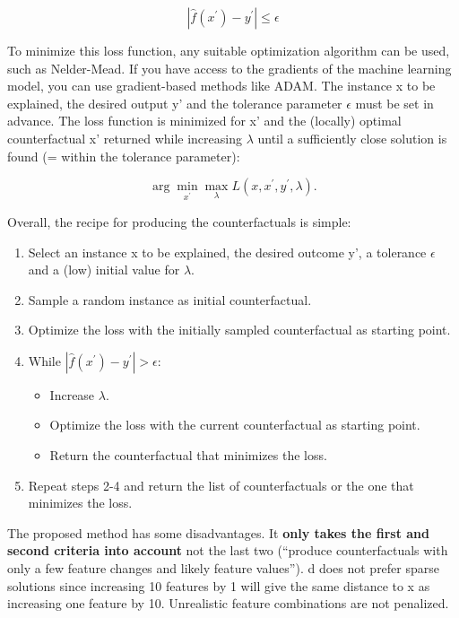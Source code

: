 \documentclass[
  10pt,
]{scrbook}
\providecommand{\tightlist}{%
  \setlength{\itemsep}{0pt}\setlength{\parskip}{0pt}}
\begin{document}
\[|\hat{f}(x^\prime)-y^\prime|\leq\epsilon\]

To minimize this loss function, any suitable optimization algorithm can be used, such as Nelder-Mead.
If you have access to the gradients of the machine learning model, you can use gradient-based methods like ADAM.
The instance x to be explained, the desired output y' and the tolerance parameter \(\epsilon\) must be set in advance.
The loss function is minimized for x' and the (locally) optimal counterfactual x' returned while increasing \(\lambda\) until a sufficiently close solution is found (= within the tolerance parameter):

\[\arg\min_{x^\prime}\max_{\lambda}L(x,x^\prime,y^\prime,\lambda).\]

Overall, the recipe for producing the counterfactuals is simple:

\begin{enumerate}
\def\labelenumi{\arabic{enumi}.}
\tightlist
\item
  Select an instance x to be explained, the desired outcome y', a tolerance \(\epsilon\) and a (low) initial value for \(\lambda\).
\item
  Sample a random instance as initial counterfactual.
\item
  Optimize the loss with the initially sampled counterfactual as starting point.
\item
  While \(|\hat{f}(x^\prime)-y^\prime|>\epsilon\):

  \begin{itemize}
  \tightlist
  \item
    Increase \(\lambda\).
  \item
    Optimize the loss with the current counterfactual as starting point.
  \item
    Return the counterfactual that minimizes the loss.
  \end{itemize}
\item
  Repeat steps 2-4 and return the list of counterfactuals or the one that minimizes the loss.
\end{enumerate}

The proposed method has some disadvantages.
It \textbf{only takes the first and second criteria into account} not the last two (``produce counterfactuals with only a few feature changes and likely feature values'').
d does not prefer sparse solutions since increasing 10 features by 1 will give the same distance to x as increasing one feature by 10.
Unrealistic feature combinations are not penalized.
\end{document}
